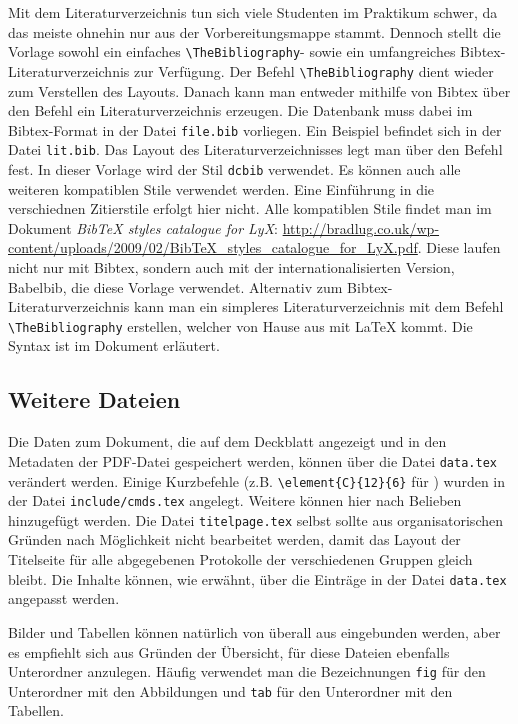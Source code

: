 Mit dem Literaturverzeichnis tun sich viele Studenten im Praktikum schwer, da das meiste ohnehin nur aus der Vorbereitungsmappe stammt. Dennoch stellt die Vorlage sowohl ein einfaches \verb|\TheBibliography|- sowie ein umfangreiches Bibtex-Literaturverzeichnis zur Verfügung. Der Befehl \verb|\TheBibliography| dient wieder zum Verstellen des Layouts. Danach kann man entweder mithilfe von Bibtex über den Befehl \verb|| ein Literaturverzeichnis erzeugen. Die Datenbank muss dabei im Bibtex-Format in der Datei \verb|file.bib| vorliegen. Ein Beispiel befindet sich in der Datei \verb|lit.bib|. Das Layout des Literaturverzeichnisses legt man über den Befehl \verb|| fest. In dieser Vorlage wird der Stil \verb|dcbib| verwendet. Es können auch alle weiteren kompatiblen Stile verwendet werden. Eine Einführung in die verschiednen Zitierstile erfolgt  hier nicht. Alle kompatiblen Stile findet man im Dokument \textit{BibTeX styles catalogue for LyX}: \url{http://bradlug.co.uk/wp-content/uploads/2009/02/BibTeX_styles_catalogue_for_LyX.pdf}. Diese laufen nicht nur mit Bibtex, sondern auch mit der internationalisierten Version, Babelbib, die diese Vorlage verwendet. Alternativ zum Bibtex-Literaturverzeichnis kann man ein simpleres Literaturverzeichnis mit dem Befehl \verb|\TheBibliography| erstellen, welcher von Hause aus mit LaTeX kommt. Die Syntax ist im Dokument erläutert.

\subsection{Weitere Dateien}
Die Daten zum Dokument, die auf dem Deckblatt angezeigt und in den Metadaten der PDF-Datei gespeichert werden, können über die Datei \verb|data.tex| verändert werden. Einige Kurzbefehle (z.B. \verb|\element{C}{12}{6}| für ) wurden in der Datei \verb|include/cmds.tex| angelegt. Weitere können hier nach Belieben hinzugefügt werden. Die Datei \verb|titelpage.tex| selbst sollte aus organisatorischen Gründen nach Möglichkeit nicht bearbeitet werden, damit das Layout der Titelseite für alle abgegebenen Protokolle der verschiedenen Gruppen gleich bleibt. Die Inhalte können, wie erwähnt, über die Einträge in der Datei \verb|data.tex| angepasst werden.

Bilder und Tabellen können natürlich von überall aus eingebunden werden, aber es empfiehlt sich aus Gründen der Übersicht, für diese Dateien ebenfalls Unterordner anzulegen. Häufig verwendet man die Bezeichnungen \verb|fig| für den Unterordner mit den Abbildungen und \verb|tab| für den Unterordner mit den Tabellen.



